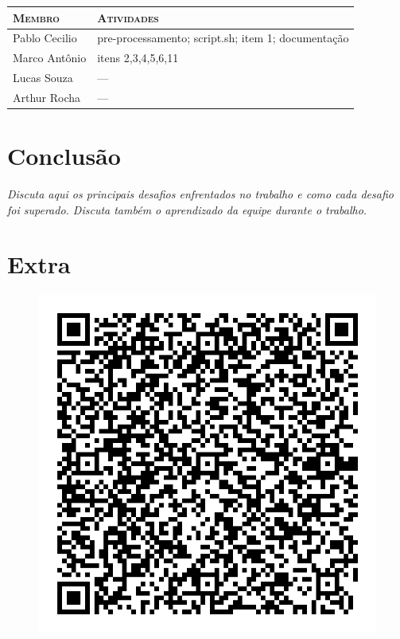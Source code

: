 \documentclass[12pt]{article}
\begin{document}
\begin{table}[!htb]
    \begin{tabular}{p{5cm}p{7.5cm}}
    
        \textsc{Membro}      & \textsc{Atividades} \\ 
	    \hline
        Pablo Cecilio & pre-processamento; script.sh; item 1; documentação \\ 
        Marco Antônio & itens 2,3,4,5,6,11\\
        Lucas Souza & --- \\
        Arthur Rocha & --- \\

    \end{tabular}
\end{table}

\section{Conclusão}

\emph{Discuta aqui os principais desafios enfrentados no trabalho e como
cada desafio foi superado. Discuta também o aprendizado 
da equipe durante o trabalho.}

\pagebreak
\section{Extra}

\begin{figure}[h]
    \centering
    \includegraphics[scale=0.3]{imagens/extra.jpg}
\end{figure}
\end{document}
